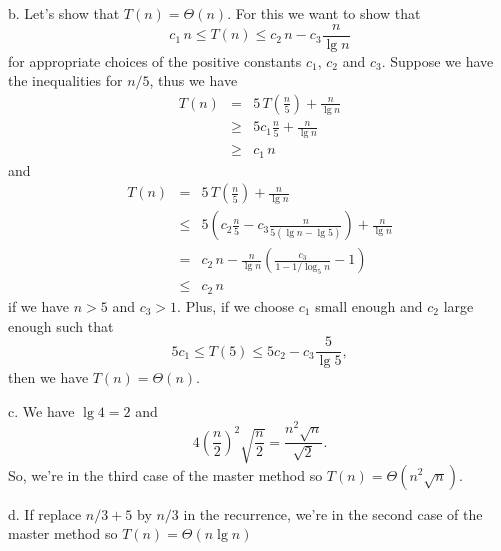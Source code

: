 \documentclass[a4paper,12pt]{article}
\newcommand{\subpar}[1]{\medskip \noindent #1.}
\begin{document}
\subpar{b}  Let's show that $T(n) = \Theta(n)$.  For this we want to
show that
\[c_1\,n \le T(n) \le c_2\,n - c_3\frac{n}{\lg n}\]
for appropriate choices of the positive constants $c_1$, $c_2$ and $c_3$.
Suppose we have the inequalities for $n/5$, thus we have
\begin{eqnarray*}
  T(n) &=& 5\,T\left(\frac{n}{5}\right) + \frac{n}{\lg n} \\
  &\ge& 5c_1\frac{n}{5} + \frac{n}{\lg n} \\
  &\ge& c_1\,n
\end{eqnarray*}
and
\begin{eqnarray*}
  T(n) &=& 5\,T\left(\frac{n}{5}\right) + \frac{n}{\lg n} \\
  &\le& 5\left(c_2\frac{n}{5} - c_3\frac{n}{5(\lg n - \lg 5)}\right) +
  \frac{n}{\lg n} \\
  &=& c_2\,n - \frac{n}{\lg n}\left(\frac{c_3}{1 - 1/\log_5n}-1\right) \\
  &\le& c_2\,n
\end{eqnarray*}
if we have $n > 5$ and $c_3 > 1$.  Plus, if we choose $c_1$ small
enough and $c_2$ large enough such that
\[ 5c_1 \le T(5) \le 5c_2 - c_3\frac{5}{\lg 5},\]
then we have $T(n) = \Theta(n)$.

\subpar{c} We have $\lg 4 = 2$ and
\[ 4 \left(\frac{n}{2}\right)^2 \sqrt{\frac{n}{2}} =
\frac{n^2 \sqrt{n}}{\sqrt{2}}.\]
So, we're in the third case of the master method so $T(n) =
\Theta(n^2\sqrt{n})$.

\subpar{d}  If replace $n/3 + 5$ by $n/3$ in the recurrence, we're in
the second case of the master method so $T(n) = \Theta(n\lg n)$
\end{document}
